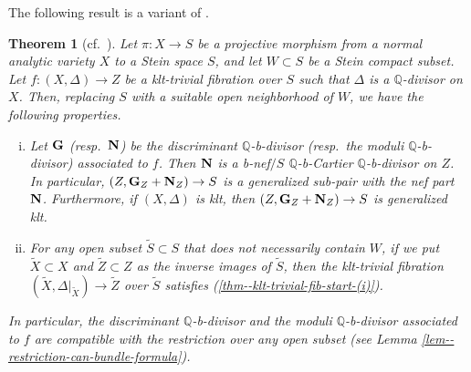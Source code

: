 \documentclass[12pt]{amsart}
\newtheorem{thm}{Theorem}[section]
\theoremstyle{definition}
\begin{document}
The following result is a variant of \cite[Theorem 21.4]{fujino-analytic-bchm}. 

\begin{thm}[{cf.~\cite[Theorem 21.4]{fujino-analytic-bchm}}]\label{thm--klt-trivial-fib-start}
Let $\pi \colon X \to S$ be a projective morphism from a normal analytic variety $X$ to a Stein space $S$, and let $W \subset S$ be a Stein compact subset. 
Let $f \colon (X,\Delta) \to Z$ be a klt-trivial fibration over $S$ such that $\Delta$ is a $\mathbb{Q}$-divisor on $X$. 
Then, replacing $S$ with a suitable open neighborhood of $W$, we have the following properties.
\begin{enumerate}[(i)]
\item \label{thm--klt-trivial-fib-start-(i)}
Let $\boldsymbol{\rm G}$ (resp.~$\boldsymbol{\rm N}$) be the discriminant $\mathbb{Q}$-b-divisor (resp.~the moduli $\mathbb{Q}$-b-divisor) associated to $f$. 
Then $\boldsymbol{\rm N}$ is a b-nef$/S$ $\mathbb{Q}$-b-Cartier $\mathbb{Q}$-b-divisor on $Z$. 
In particular, $(Z, \boldsymbol{\rm G}_{Z} +\boldsymbol{\rm N}_{Z}) \to S$ is a generalized sub-pair with the nef part $\boldsymbol{\rm N}$. 
Furthermore, if $(X,\Delta)$ is klt, then $(Z, \boldsymbol{\rm G}_{Z} +\boldsymbol{\rm N}_{Z}) \to S$ is generalized klt. 
\item \label{thm--klt-trivial-fib-start-(ii)}
For any open subset $\tilde{S} \subset S$ that does not necessarily contain $W$, if we put $\tilde{X} \subset X$ and $\tilde{Z} \subset Z$ as the inverse images of $\tilde{S}$, then the klt-trivial fibration $(\tilde{X}, \Delta|_{\tilde{X}}) \to \tilde{Z}$ over $\tilde{S}$ satisfies (\ref{thm--klt-trivial-fib-start-(i)}). 
\end{enumerate}
In particular, the discriminant $\mathbb{Q}$-b-divisor and the moduli $\mathbb{Q}$-b-divisor associated to $f$ are compatible with the restriction over any open subset (see Lemma \ref{lem--restriction-can-bundle-formula}).  
\end{thm}
\end{document}
